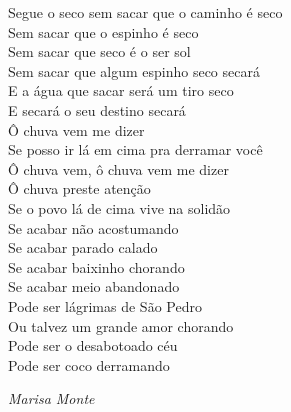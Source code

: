 \documentclass[./main.tex]{subfiles}
\begin{document}
\newpage
\thispagestyle{empty}
\epigraph{
Segue o seco sem sacar que o caminho é seco \\
Sem sacar que o espinho é seco\\
Sem sacar que seco é o ser sol\\
Sem sacar que algum espinho seco secará\\
E a água que sacar será um tiro seco\\
E secará o seu destino secará\\
Ô chuva vem me dizer\\
Se posso ir lá em cima pra derramar você\\
Ô chuva vem, ô chuva vem me dizer\\
Ô chuva preste atenção\\
Se o povo lá de cima vive na solidão\\
Se acabar não acostumando\\
Se acabar parado calado\\
Se acabar baixinho chorando\\
Se acabar meio abandonado\\
Pode ser lágrimas de São Pedro\\
Ou talvez um grande amor chorando\\
Pode ser o desabotoado céu\\
Pode ser coco derramando
}{\textit{Marisa Monte}}
\clearpage
\end{document}
